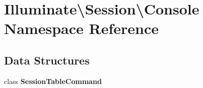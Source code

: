 \section{Illuminate\textbackslash{}Session\textbackslash{}Console Namespace Reference}
\label{namespace_illuminate_1_1_session_1_1_console}
\subsection*{Data Structures}
\begin{DoxyCompactItemize}
\item 
class {\bf Session\+Table\+Command}
\end{DoxyCompactItemize}
